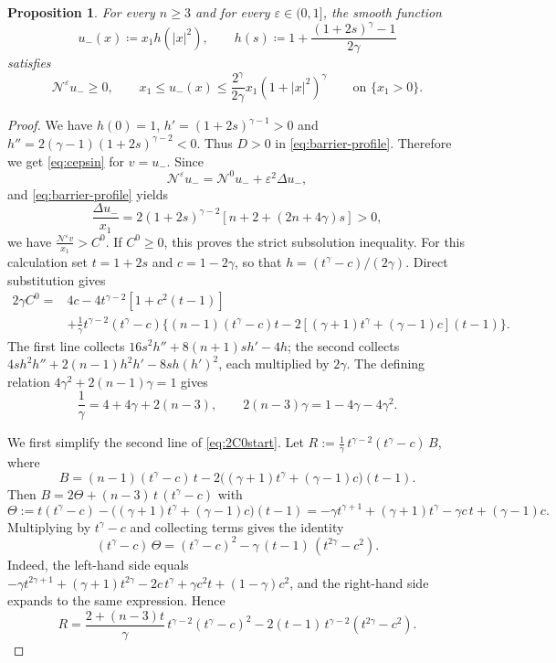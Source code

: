 \documentclass[11pt]{amsart}
\renewcommand{\leq}{\leqslant}
\renewcommand{\geq}{\geqslant}
\renewcommand{\ge}{>}
\newcommand{\eps}{\varepsilon}
\newcommand{\Ne}{\mathcal N^\eps}
\newtheorem{proposition}[theorem]{Proposition}
\theoremstyle{definition}
\theoremstyle{remark}
\numberwithin{equation}{section}
\begin{document}
\begin{proposition}\label{prop:barrier-lower-higher}
For every $n\geq3$ and for every $\eps\in(0,1]$, the smooth function
\[
 u_-(x)\coloneqq x_1h(|x|^2),\qquad
 h(s)\coloneqq1+\frac{(1+2s)^\gamma-1}{2\gamma}
\]
satisfies
\begin{equation}\label{eq:barrier-lower-higher}
 \Ne u_-\geq 0,\qquad
 x_1\leq u_-(x)\leq\frac{2^\gamma}{2\gamma}x_1(1+|x|^2)^\gamma\qquad\text{on }\{x_1\ge 0\}.
\end{equation}
\end{proposition}
\begin{proof}
We have $h(0)=1$, $h'=(1+2s)^{\gamma-1}>0$ and
$h''=2(\gamma-1)(1+2s)^{\gamma-2}<0$.
Thus $D>0$ in \eqref{eq:barrier-profile}. Therefore we get \eqref{eq:cepsin} for $v=u_-$. Since 
\[
\Ne u_-= \mathcal{N}^0u_-+ \eps^2 \Delta  u_-,
\]
and \eqref{eq:barrier-profile} yields
\[
 \frac{\Delta u_-}{x_1}
 =2(1+2s)^{\gamma-2}[n+2+(2n+4\gamma)s]>0,
\]
we have $\frac{\Ne v}{x_1} \ge C^0$.
If $C^0\geq0$, this proves the strict subsolution inequality.
For this calculation set $t=1+2s$ and $c=1-2\gamma$, so that
$h=(t^\gamma-c)/(2\gamma)$. Direct substitution gives
\begin{equation}
\label{eq:2C0start}
 \begin{split}
 2\gamma C^0={}&4c-4t^{\gamma-2}[1+c^2(t-1)]\\
 &+\frac1\gamma t^{\gamma-2}(t^\gamma-c)
 \big\{(n-1)(t^\gamma-c)t
       -2[(\gamma+1)t^\gamma+(\gamma-1)c](t-1)\big\}.
 \end{split}
\end{equation}
The first line collects $16s^2h''+8(n+1)s h'-4h$; the second collects
$4s h^2h''+2(n-1)h^2h'-8s h(h')^2$, each multiplied by $2\gamma$. The defining relation $4\gamma^2+2(n-1)\gamma=1$ gives
\[
  \frac1\gamma=4+4\gamma+2(n-3),\qquad
  2(n-3)\gamma=1-4\gamma-4\gamma^{2}.
\]

\medskip
\noindent
We first simplify the second line of \eqref{eq:2C0start}. Let
$R:=\frac1\gamma\,t^{\gamma-2}(t^\gamma-c)\,B$, where
\[
  B=(n-1)(t^\gamma-c)\,t-2\big((\gamma+1)t^\gamma+(\gamma-1)c\big)(t-1).
\]
Then $B=2\Theta+(n-3)\,t\,(t^\gamma-c)$ with
\[
  \Theta:=t(t^\gamma-c)-\big((\gamma+1)t^\gamma+(\gamma-1)c\big)(t-1)
  =-\gamma t^{\gamma+1}+(\gamma+1)t^{\gamma}-\gamma c\,t+(\gamma-1)c .
\]
Multiplying by $t^\gamma-c$ and collecting terms gives the identity
\begin{equation}\tag{L}
  (t^\gamma-c)\,\Theta=(t^\gamma-c)^2-\gamma\,(t-1)\,(t^{2\gamma}-c^{2}).
\end{equation}
Indeed, the left-hand side equals
$-\gamma t^{2\gamma+1}+(\gamma+1)t^{2\gamma}-2c\,t^{\gamma}+\gamma c^2 t+(1-\gamma)c^2$,
and the right-hand side expands to the same expression. Hence
\[
  R=\frac{2+(n-3)t}{\gamma}\,t^{\gamma-2}(t^\gamma-c)^2-2(t-1)\,t^{\gamma-2}(t^{2\gamma}-c^2).
\]


\end{proof}
\end{document}
